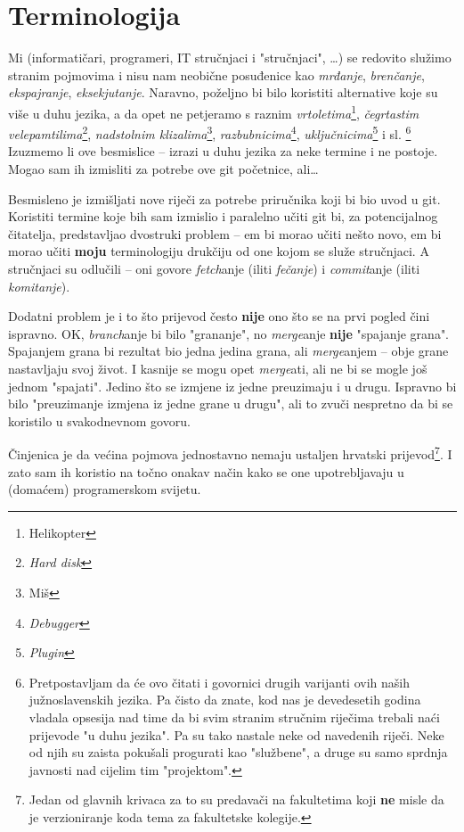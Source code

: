 \chapter*{Terminologija}

Mi (informatičari, programeri, IT stručnjaci i "stručnjaci", \dots) se redovito služimo stranim pojmovima i nisu nam neobične posuđenice kao \emph{mrđanje}, \emph{brenčanje}, \emph{ekspajranje}, \emph{eksekjutanje}.
Naravno, poželjno bi bilo koristiti alternative koje su više u duhu jezika, a da opet ne petjeramo s raznim \emph{vrtoletima}\footnote{Helikopter}, \emph{čegrtastim velepamtilima}\footnote{\emph{Hard disk}}, \emph{nadstolnim klizalima}\footnote{Miš}, \emph{razbubnicima}\footnote{\emph{Debugger}}, \emph{uključnicima}\footnote{\emph{Plugin}} i sl.%
\footnote{Pretpostavljam da će ovo čitati i govornici drugih varijanti ovih naših južnoslavenskih jezika. Pa čisto da znate, kod nas je devedesetih godina vladala opsesija nad time da bi svim stranim stručnim riječima trebali naći prijevode "u duhu jezika". Pa su tako nastale neke od navedenih riječi. Neke od njih su zaista pokušali progurati kao "službene", a druge su samo sprdnja javnosti nad cijelim tim "projektom".}
Izuzmemo li ove besmislice -- izrazi u duhu jezika za neke termine i ne postoje.
Mogao sam ih izmisliti za potrebe ove git početnice, ali\dots

Besmisleno je izmišljati nove riječi za potrebe priručnika koji bi bio uvod u git.
Koristiti termine koje bih sam izmislio i paralelno učiti git bi, za potencijalnog čitatelja, predstavljao dvostruki problem -- em bi morao učiti nešto novo, em bi morao učiti \textbf{moju} terminologiju drukčiju od one kojom se služe stručnjaci.
A stručnjaci su odlučili -- oni govore \emph{fetch}anje (iliti \emph{fečanje}) i \emph{commit}anje (iliti \emph{komitanje}).

Dodatni problem je i to što prijevod često \textbf{nije} ono što se na prvi pogled čini ispravno.
OK, \emph{branch}anje bi bilo "grananje", no \emph{merge}anje \textbf{nije} "spajanje grana". 
Spajanjem grana bi rezultat bio jedna jedina grana, ali \emph{merge}anjem -- obje grane nastavljaju svoj život. 
I kasnije se mogu opet \emph{merge}ati, ali ne bi se mogle još jednom "spajati".
Jedino što se izmjene iz jedne preuzimaju i u drugu. 
Ispravno bi bilo "preuzimanje izmjena iz jedne grane u drugu", ali to zvuči nespretno da bi se koristilo u svakodnevnom govoru.

Činjenica je da većina pojmova jednostavno nemaju ustaljen hrvatski prijevod\footnote{Jedan od glavnih krivaca za to su predavači na fakultetima koji \textbf{ne} misle da je verzioniranje koda tema za fakultetske kolegije.}. 
I zato sam ih koristio na točno onakav način kako se one upotrebljavaju u (domaćem) programerskom svijetu.

